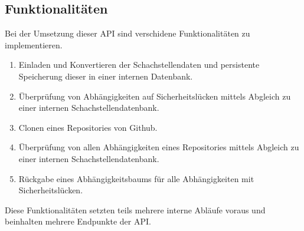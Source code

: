 \subsection{Funktionalitäten} \label{sec:Funktionalitäten}
Bei der Umsetzung dieser API sind verschidene Funktionalitäten zu implementieren.
\begin{enumerate}
    \item Einladen und Konvertieren der Schachstellendaten und persistente Speicherung dieser in einer internen Datenbank.
    \item Überprüfung von Abhängigkeiten auf Sicherheitslücken mittels Abgleich zu einer internen Schachstellendatenbank.
    \item Clonen eines Repositories von Github.
    \item Überprüfung von allen Abhängigkeiten eines Repositories mittels Abgleich zu einer internen Schachstellendatenbank.
    \item Rückgabe eines Abhängigkeitsbaums für alle Abhängigkeiten mit Sicherheitslücken. 
\end{enumerate}
Diese Funktionalitäten setzten teils mehrere interne Abläufe voraus und beinhalten mehrere Endpunkte der API.